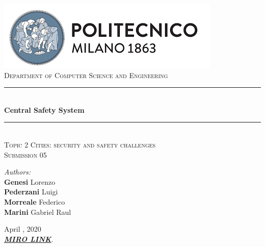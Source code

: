 \documentclass[a4paper, hidelinks, 12pt]{report}
\begin{document}
    \begin{titlepage}
        \centering
        \vspace*{0.7 cm}
        \includegraphics[scale = 0.85]{assets/polimi.png}\\[1.6 cm]
        \textsc{\large Department of Computer Science and Engineering}\\[1.8 cm]

        \rule{\linewidth}{0.2 mm} \\[0.4 cm]
        { \huge \bfseries Central Safety System}\\
        \rule{\linewidth}{0.2 mm} \\[1.5 cm]

        \textsc{\large Topic 2 Cities: security and safety challenges}\\[0.5 cm]
        \textsc{\Large Submission 05}\\[1 cm]


        \begin{minipage}{1\textwidth}
            \begin{flushleft}
                \large
                \emph{Authors:}\\
                \textbf{Genesi} Lorenzo \\
                \textbf{Pederzani} Luigi \\
                \textbf{Morreale} Federico \\
                \textbf{Marini} Gabriel Raul \\
            \end{flushleft}
        \end{minipage}
        \newline
        \newline
        {\large April  , 2020}\\[2 cm]
        \href{https://miro.com/app/board/o9J_kuKN_dk=/}{\textbf{\textit{MIRO LINK}}}.
        \vfill
    \end{titlepage}

    \tableofcontents
    \newpage
    \setcounter{page}{1}

    \newpage
    
\end{document}
